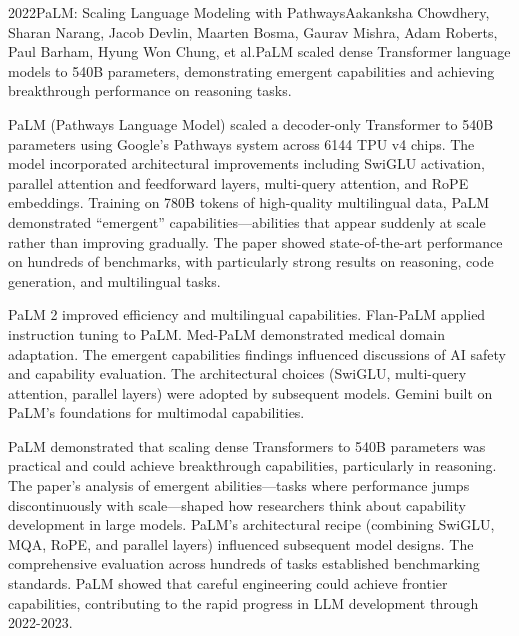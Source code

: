 
\begin{papersummary}{2022}{PaLM: Scaling Language Modeling with Pathways}{Aakanksha Chowdhery, Sharan Narang, Jacob Devlin, Maarten Bosma, Gaurav Mishra, Adam Roberts, Paul Barham, Hyung Won Chung, et al.}{PaLM scaled dense Transformer language models to 540B parameters, demonstrating emergent capabilities and achieving breakthrough performance on reasoning tasks.}

PaLM (Pathways Language Model) scaled a decoder-only Transformer to 540B parameters using Google's Pathways system across 6144 TPU v4 chips. The model incorporated architectural improvements including SwiGLU activation, parallel attention and feedforward layers, multi-query attention, and RoPE embeddings. Training on 780B tokens of high-quality multilingual data, PaLM demonstrated ``emergent'' capabilities---abilities that appear suddenly at scale rather than improving gradually. The paper showed state-of-the-art performance on hundreds of benchmarks, with particularly strong results on reasoning, code generation, and multilingual tasks.

PaLM 2 improved efficiency and multilingual capabilities. Flan-PaLM applied instruction tuning to PaLM. Med-PaLM demonstrated medical domain adaptation. The emergent capabilities findings influenced discussions of AI safety and capability evaluation. The architectural choices (SwiGLU, multi-query attention, parallel layers) were adopted by subsequent models. Gemini built on PaLM's foundations for multimodal capabilities.

PaLM demonstrated that scaling dense Transformers to 540B parameters was practical and could achieve breakthrough capabilities, particularly in reasoning. The paper's analysis of emergent abilities---tasks where performance jumps discontinuously with scale---shaped how researchers think about capability development in large models. PaLM's architectural recipe (combining SwiGLU, MQA, RoPE, and parallel layers) influenced subsequent model designs. The comprehensive evaluation across hundreds of tasks established benchmarking standards. PaLM showed that careful engineering could achieve frontier capabilities, contributing to the rapid progress in LLM development through 2022-2023.

\end{papersummary}
